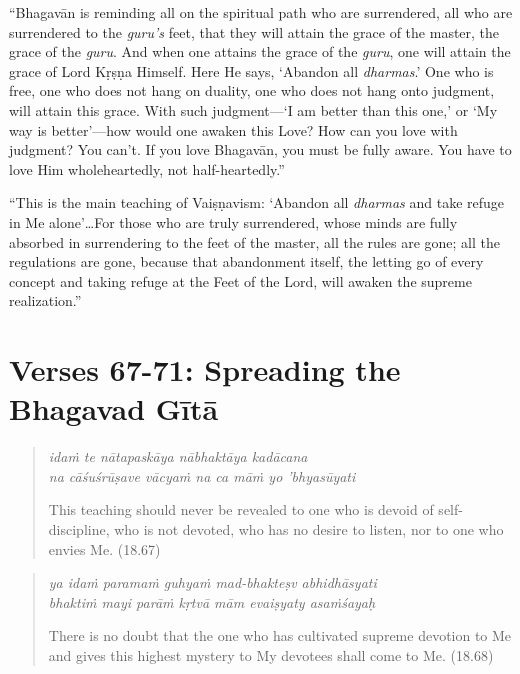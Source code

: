 \documentclass[12pt, twoside, openright]{memoir}
\begin{document}
\enquote{Bhagavān is reminding all on the spiritual path who are surrendered, all who are surrendered to the \textit{guru’s} feet, that they will attain the grace of the master, the grace of the \textit{guru}. And when one attains the grace of the \textit{guru}, one will attain the grace of Lord Kṛṣṇa Himself. Here He says, \enquote{Abandon all \textit{dharmas}.} One who is free, one who does not hang on duality, one who does not hang onto judgment, will attain this grace. With such judgment---\enquote{I am better than this one,} or \enquote{My way is better}---how would one awaken this Love? How can you love with judgment? You can’t. If you love Bhagavān, you must be fully aware. You have to love Him wholeheartedly, not half-heartedly.}

\enquote{This is the main teaching of Vaiṣṇavism: \enquote{Abandon all \textit{dharmas} and take refuge in Me alone}\ldots For those who are truly surrendered, whose minds are fully absorbed in surrendering to the feet of the master, all the rules are gone; all the regulations are gone, because that abandonment itself, the letting go of every concept and taking refuge at the Feet of the Lord, will awaken the supreme realization.}

\section{Verses 67-71: Spreading the Bhagavad Gītā}\label{sec-verses-67-71-spreading-the-bhagavad-gita}


\par
\begin{verse}
\textit{idaṁ te nātapaskāya nābhaktāya kadācana} \\
\textit{na cāśuśrūṣave vācyaṁ na ca māṁ yo ’bhyasūyati}

\noindent This teaching should never be revealed to one who is devoid of self-discipline, who is not devoted, who has no desire to listen, nor to one who envies Me. (18.67)
\end{verse}
\par



\par
\begin{verse}
\textit{ya idaṁ paramaṁ guhyaṁ mad-bhakteṣv abhidhāsyati} \\
\textit{bhaktiṁ mayi parāṁ kṛtvā mām evaiṣyaty asaṁśayaḥ}

\noindent There is no doubt that the one who has cultivated supreme devotion to Me and gives this highest mystery to My devotees shall come to Me. (18.68)
\end{verse}
\par
\end{document}
